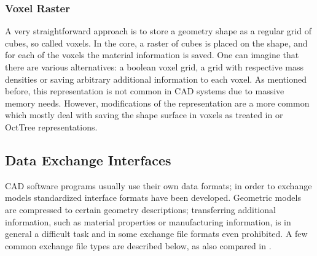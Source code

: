 \subsubsection{Voxel Raster}
A very straightforward approach is to store a geometry shape as a regular grid of cubes, so called voxels. In the core, a raster of cubes is placed on the shape, and for each of the voxels the material information is saved. One can imagine that there are various alternatives: a boolean voxel grid, a grid with respective mass densities or saving arbitrary additional information to each voxel. As mentioned before, this representation is not common in CAD systems due to massive memory needs. However, modifications of the representation are a more common which mostly deal with saving the shape surface in voxels as treated in \cite{CohenOr1995} or OctTree representations.  

\subsection{Data Exchange Interfaces}
\ac{CAD} software programs usually use their own data formats; in order to exchange models standardized interface formats have been developed. Geometric models are compressed to certain geometry descriptions; transferring additional information, such as material properties or manufacturing information, is in general a difficult task and in some exchange file formats even prohibited. A few common exchange file types are described below, as also compared in \cite{STL}.
